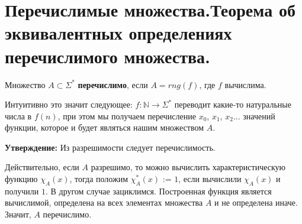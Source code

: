 \section{Перечислимые множества.Теорема об эквивалентных определениях перечислимого множества.}
\begin{definition} Множество $A \subset \Sigma^*$ \textbf{перечислимо}, если $A=rng(f)$, где $f$ вычислима.
\end{definition}
Интуитивно это значит следующее: $f: \mathbb{N} \to \Sigma^*$ переводит какие-то натуральные числа в $f(n)$, при этом мы получаем перечисление $x_{0}$, $x_{1}$, $x_{2}$... значений функции, которое и будет являться нашим множеством $A$.

\begin{quote*} {\textbf{Утверждение: }}
Из разрешимости следует перечислимость.
\par Действительно, если $A$ разрешимо, то можно вычислить характеристическую функцию $\chi_{A}(x)$, тогда положим
$\chi^*_{A}(x)$ := $1$, если вычислили  $\chi_{A}(x)$ и получили $1$. В другом случае зациклимся. Построенная функция является вычислимой, определена на всех элементах множества $A$ и не определена иначе. Значит, $A$  перечислимо.
\end{quote*}
